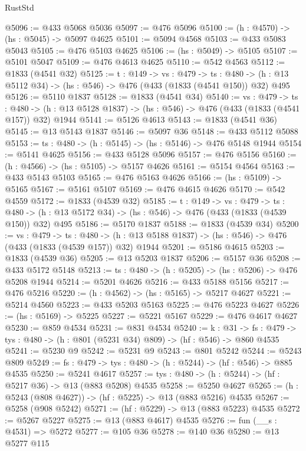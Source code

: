 \begin{lexlean}{RustStd}
\begin{coremodule}
@5096 := @433 @5068 @5036
@5097 := @476 @5096
@5100 := (h : @4570) -> (hs : @5045) -> @5097 @4625
@5101 := @5094 @4568
@5103 := @433 @5083 @5043
@5105 := @476 @5103 @4625
@5106 := (hs : @5049) -> @5105
@5107 := @5101 @5047
@5109 := @476 @4613 @4625
@5110 := @542 @4563
@5112 := @1833 (@4541 @32)
@5125 := {t : @149} ->
  {vs : @479} ->
  {ts : @480} -> (h : @13 @5112 @34) -> (hs : @546) -> @476 (@433 (@1833 (@4541 @150)) @32) @495
@5126 := @5110 @1837
@5128 := @1833 (@4541 @34)
@5140 := {vs : @479} ->
  {ts : @480} -> (h : @13 @5128 @1837) -> (hs : @546) -> @476 (@433 (@1833 (@4541 @157)) @32) @1944
@5141 := @5126 @4613
@5143 := @1833 (@4541 @36)
@5145 := @13 @5143 @1837
@5146 := @5097 @36
@5148 := @433 @5112 @5088
@5153 := {ts : @480} -> (h : @5145) -> (hs : @5146) -> @476 @5148 @1944
@5154 := @5141 @4625
@5156 := @433 @5128 @5096
@5157 := @476 @5156
@5160 := (h : @4566) -> (hs : @5105) -> @5157 @4626
@5161 := @5154 @4564
@5163 := @433 @5143 @5103
@5165 := @476 @5163 @4626
@5166 := (hs : @5109) -> @5165
@5167 := @5161 @5107
@5169 := @476 @4615 @4626
@5170 := @542 @4559
@5172 := @1833 (@4539 @32)
@5185 := {t : @149} ->
  {vs : @479} ->
  {ts : @480} -> (h : @13 @5172 @34) -> (hs : @546) -> @476 (@433 (@1833 (@4539 @150)) @32) @495
@5186 := @5170 @1837
@5188 := @1833 (@4539 @34)
@5200 := {vs : @479} ->
  {ts : @480} -> (h : @13 @5188 @1837) -> (hs : @546) -> @476 (@433 (@1833 (@4539 @157)) @32) @1944
@5201 := @5186 @4615
@5203 := @1833 (@4539 @36)
@5205 := @13 @5203 @1837
@5206 := @5157 @36
@5208 := @433 @5172 @5148
@5213 := {ts : @480} -> (h : @5205) -> (hs : @5206) -> @476 @5208 @1944
@5214 := @5201 @4626
@5216 := @433 @5188 @5156
@5217 := @476 @5216
@5220 := (h : @4562) -> (hs : @5165) -> @5217 @4627
@5221 := @5214 @4560
@5223 := @433 @5203 @5163
@5225 := @476 @5223 @4627
@5226 := (hs : @5169) -> @5225
@5227 := @5221 @5167
@5229 := @476 @4617 @4627
@5230 := @859 @4534
@5231 := @831 @4534
@5240 := {k : @31} ->
  {fs : @479} -> {tys : @480} -> (h : @801 (@5231 @34) @809) -> (hf : @546) -> @860 @4535
@5241 := @5230 @9
@5242 := @5231 @9
@5243 := @801 @5242
@5244 := @5243 @809
@5249 := {fs : @479} -> {tys : @480} -> (h : @5244) -> (hf : @546) -> @885 @4535
@5250 := @5241 @4617
@5257 := {tys : @480} -> (h : @5244) -> (hf : @5217 @36) -> @13 (@883 @5208) @4535
@5258 := @5250 @4627
@5265 := (h : @5243 (@808 @4627)) -> (hf : @5225) -> @13 (@883 @5216) @4535
@5267 := @5258 (@908 @5242)
@5271 := (hf : @5229) -> @13 (@883 @5223) @4535
@5272 := @5267 @5227
@5275 := @13 (@883 @4617) @4535
@5276 := fun (__s : @4531) => @5272
@5277 := @105 @36
@5278 := @140 @36
@5280 := @13 @5277 @115

\end{coremodule}
\end{lexlean}
